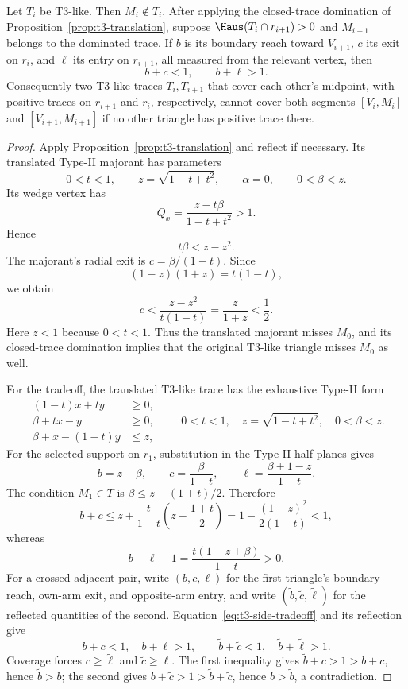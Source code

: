\begin{lemma}
\label{lem:t3-midpoint-tradeoff}
Let $T_i$ be T3-like.  Then $M_i\notin T_i$.  After applying the closed-trace
domination of Proposition~\ref{prop:t3-translation}, suppose
$\Haus(T_i\cap r_{i+1})>0$ and $M_{i+1}$ belongs to the dominated trace.
If $b$ is its boundary reach toward $V_{i+1}$, $c$ its exit on $r_i$, and
$\ell$ its entry on $r_{i+1}$, all measured from the relevant
vertex, then
\begin{equation}
 b+c<1,\qquad b+\ell>1.
 \label{eq:t3-side-tradeoff}
\end{equation}
Consequently two T3-like traces $T_i,T_{i+1}$ that cover each other's
midpoint, with positive traces on $r_{i+1}$ and $r_i$, respectively, cannot
cover both segments $[V_i,M_i]$ and $[V_{i+1},M_{i+1}]$ if no other triangle
has positive trace there.
\end{lemma}

\begin{proof}
Apply Proposition~\ref{prop:t3-translation} and reflect if necessary.  Its
translated Type-II majorant has parameters
\[
 0<t<1,\qquad z=\sqrt{1-t+t^2},\qquad \alpha=0,\qquad 0<\beta<z.
\]
Its wedge vertex has
\[
 Q_x=\frac{z-t\beta}{1-t+t^2}>1.
\]
Hence
\[
 t\beta<z-z^2.
\]
The majorant's radial exit is $c=\beta/(1-t)$.  Since
\[
 (1-z)(1+z)=t(1-t),
\]
we obtain
\[
 c<\frac{z-z^2}{t(1-t)}=\frac{z}{1+z}<\frac12.
\]
Here $z<1$ because $0<t<1$.  Thus the translated majorant misses $M_0$,
and its closed-trace domination
implies that the original T3-like triangle misses $M_0$ as well.

For the tradeoff, the translated T3-like trace has the exhaustive Type-II
form
\[
 \begin{aligned}
 (1-t)x+ty&\ge0,\\
 \beta+tx-y&\ge0,\\
 \beta+x-(1-t)y&\le z,
 \end{aligned}
 \qquad 0<t<1,\quad z=\sqrt{1-t+t^2},\quad0<\beta<z.
\]
For the selected support on $r_1$, substitution in the Type-II half-planes
gives
\[
 b=z-\beta,\qquad c=\frac{\beta}{1-t},\qquad
 \ell=\frac{\beta+1-z}{1-t}.
\]
The condition $M_1\in T$ is
$\beta\le z-(1+t)/2$.  Therefore
\[
 b+c\le z+\frac{t}{1-t}
 \left(z-\frac{1+t}{2}\right)
 =1-\frac{(1-z)^2}{2(1-t)}<1,
\]
whereas
\[
 b+\ell-1=\frac{t(1-z+\beta)}{1-t}>0.
\]
For a crossed adjacent pair, write $(b,c,\ell)$ for the first triangle's
boundary reach, own-arm exit, and opposite-arm entry, and write
$(\widetilde b,\widetilde c,\widetilde\ell)$ for the reflected quantities of
the second.  Equation~\eqref{eq:t3-side-tradeoff} and its reflection give
\[
 b+c<1,\quad b+\ell>1,\qquad
 \widetilde b+\widetilde c<1,\quad
 \widetilde b+\widetilde\ell>1.
\]
Coverage forces $c\ge\widetilde\ell$ and
$\widetilde c\ge\ell$.  The first inequality gives
$\widetilde b+c>1>b+c$, hence $\widetilde b>b$; the second gives
$b+\widetilde c>1>\widetilde b+\widetilde c$, hence
$b>\widetilde b$, a contradiction.
\end{proof}

